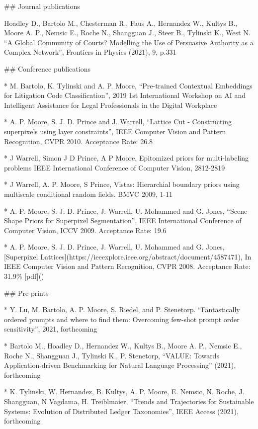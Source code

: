 
## Journal publications 

Hoadley D., Bartolo M., Chesterman R., Faus A., Hernandez W., Kultys B., Moore A. P., Nemsic E., Roche N., Shangguan J., Steer B., Tylinski K., West N. “A Global Community of Courts? Modelling the Use of Persuasive Authority as a Complex Network”, Frontiers in Physics (2021), 9, p.331 

## Conference publications 

* M. Bartolo, K. Tylinski and A. P. Moore, “Pre-trained Contextual Embeddings for Litigation Code Classification”, 2019 1st International Workshop on AI and Intelligent Assistance for Legal Professionals in the Digital Workplace

* A. P. Moore, S. J. D. Prince and J. Warrell, “Lattice Cut - Constructing superpixels using layer constraints”, IEEE Computer Vision and Pattern Recognition, CVPR 2010. Acceptance Rate: 26.8%

* J Warrell, Simon J D Prince, A P Moore, Epitomized priors for multi-labeling problems 
IEEE International Conference of Computer Vision, 2812-2819

* J Warrell, A. P. Moore, S Prince, Vistas: Hierarchial boundary priors using multiscale conditional random fields. BMVC 2009, 1-11

* A. P. Moore, S. J. D. Prince, J. Warrell, U. Mohammed and G. Jones, “Scene Shape Priors for Superpixel Segmentation”, IEEE International Conference of Computer Vision, ICCV 2009. Acceptance Rate: 19.6%

* A. P. Moore, S. J. D. Prince, J. Warrell, U. Mohammed and G. Jones, [Superpixel Lattices](https://ieeexplore.ieee.org/abstract/document/4587471), In IEEE Computer Vision and Pattern Recognition, CVPR 2008. Acceptance Rate: 31.9\% [pdf]()


## Pre-prints 

* Y. Lu, M. Bartolo, A. P. Moore, S. Riedel, and P. Stenetorp. “Fantastically ordered prompts and where to find them: Overcoming few-shot prompt order sensitivity”, 2021, forthcoming

* Bartolo M., Hoadley D., Hernandez W., Kultys B., Moore A. P., Nemsic E., Roche N., Shangguan J., Tylinski K., P. Stenetorp, “VALUE: Towards Application-driven Benchmarking for Natural Language Processing” (2021), forthcoming

* K. Tylinski, W. Hernandez,  B. Kultys, A. P. Moore,  E. Nemsic,  N. Roche, J. Shangguan, N Vagdama, H. Treiblmaier,  “Trends and Trajectories for Sustainable Systems: Evolution of Distributed Ledger Taxonomies”, IEEE Access (2021), forthcoming

